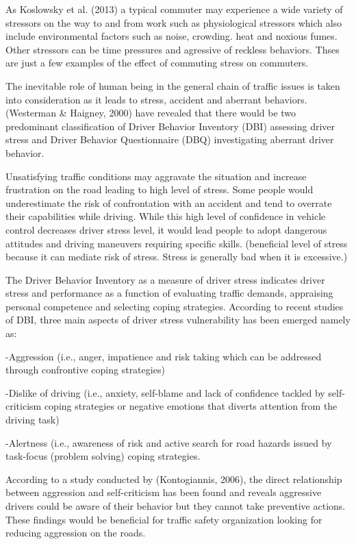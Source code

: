 \documentclass[
11pt, %
oneside, %
english, %
singlespacing, %
]{macthesis} %
\begin{document}
As Koslowsky et al. (2013) a typical commuter may experience a wide variety of stressors on the way to and from work such as physiological stressors which also include environmental factors such as noise, crowding. heat and noxious fumes. Other stressors can be time pressures and agressive of reckless behaviors. Thses are just a few examples of the effect of commuting stress on commuters.

The inevitable role of human being in the general chain of traffic issues is taken into consideration as it leads to stress, accident and aberrant behaviors. (Westerman \& Haigney, 2000) have revealed that there would be two predominant classification of Driver Behavior Inventory (DBI) assessing driver stress and Driver Behavior Questionnaire (DBQ) investigating aberrant driver behavior.

Unsatisfying traffic conditions may aggravate the situation and increase frustration on the road leading to high level of stress. Some people would underestimate the risk of confrontation with an accident and tend to overrate their capabilities while driving. While this high level of confidence in vehicle control decreases driver stress level, it would lead people to adopt dangerous attitudes and driving maneuvers requiring specific skills. (beneficial level of stress because it can mediate risk of stress. Stress is generally bad when it is excessive.)

The Driver Behavior Inventory as a measure of driver stress indicates driver stress and performance as a function of evaluating traffic demands, appraising personal competence and selecting coping strategies. According to recent studies of DBI, three main aspects of driver stress vulnerability has been emerged namely as:

-Aggression (i.e., anger, impatience and risk taking which can be addressed through confrontive coping strategies)

-Dislike of driving (i.e., anxiety, self-blame and lack of confidence tackled by self-criticism coping strategies or negative emotions that diverts attention from the driving task)

-Alertness (i.e., awareness of risk and active search for road hazards issued by task-focus (problem solving) coping strategies.

According to a study conducted by (Kontogiannis, 2006), the direct relationship between aggression and self-criticism has been found and reveals aggressive drivers could be aware of their behavior but they cannot take preventive actions. These findings would be beneficial for traffic safety organization looking for reducing aggression on the roads.
\end{document}
